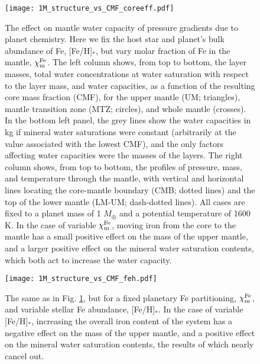 \begin{figure}[!h]
\centering\texttt{[image: 1M\_structure\_vs\_CMF\_coreeff.pdf]}
\caption[The effect on mantle water capacity of pressure gradients due to varying the molar fraction of Fe in the mantle.]{The effect on mantle water capacity of pressure gradients due to planet chemistry. Here we fix the host star and planet's bulk abundance of Fe, [Fe/H]$_*$, but vary molar fraction of Fe in the mantle, $\chi^{\rm Fe}_{\rm m}$. The left column shows, from top to bottom, the layer masses, total water concentrations at water saturation with respect to the layer mass, and water capacities, as a function of the resulting core mass fraction (CMF), for the upper mantle (UM; triangles), mantle transition zone (MTZ; circles), and whole mantle (crosses). In the bottom left panel, the grey lines show the water capacities in kg if mineral water saturations were constant (arbitrarily at the value associated with the lowest CMF), and the only factors affecting water capacities were the masses of the layers. The right column shows, from top to bottom, the profiles of pressure, mass, and temperature through the mantle, with vertical and horizontal lines locating the core-mantle boundary (CMB; dotted lines) and the top of the lower mantle (LM-UM; dash-dotted lines). All cases are fixed to a planet mass of 1 $M_\oplus$ and a potential temperature of 1600 K. In the case of variable $\chi^{\rm Fe}_{\rm m}$, moving iron from the core to the mantle has a small positive effect on the mass of the upper mantle, and a larger positive effect on the mineral water saturation contents, which both act to increase the water capacity.}
\label{fig:pressure_gradients_coreeff}
\end{figure}


\begin{figure}
         \centering
         \texttt{[image: 1M\_structure\_vs\_CMF\_feh.pdf]}
         \caption[The effect on mantle water capacity of pressure gradients due varying the stellar Fe abundance.]{The same as in Fig. \ref{fig:pressure_gradients_coreeff}, but for a fixed planetary Fe partitioning, $\chi^{\rm Fe}_{\rm m}$, and variable stellar Fe abundance, [Fe/H]$_*$. In the case of variable [Fe/H]$_*$, increasing the overall iron content of the system has a negative effect on the mass of the upper mantle, and a positive effect on the mineral water saturation contents, the results of which nearly cancel out.}
        \label{fig:pressure_gradients_feh}
\end{figure}


